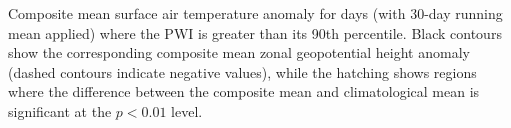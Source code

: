 \label{fig:tas_composite}
Composite mean surface air temperature anomaly for days (with 30-day running mean applied) where the PWI is greater than its 90th percentile. Black contours show the corresponding composite mean zonal geopotential height anomaly (dashed contours indicate negative values), while the hatching shows regions where the difference between the composite mean and climatological mean is significant at the $p < 0.01$ level.  

